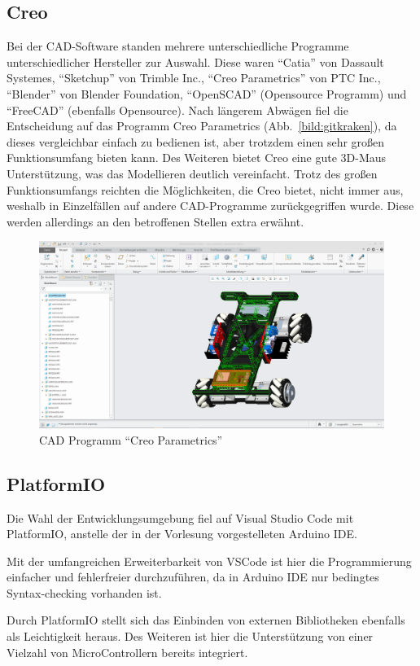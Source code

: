 \subsection{Creo}
Bei der CAD-Software standen mehrere unterschiedliche Programme unterschiedlicher Hersteller zur Auswahl.
Diese waren ``Catia'' von Dassault Systemes, ``Sketchup'' von Trimble Inc., ``Creo Parametrics'' von PTC Inc., ``Blender'' von Blender Foundation, ``OpenSCAD'' (Opensource Programm) und ``FreeCAD'' (ebenfalls Opensource).
Nach längerem Abwägen fiel die Entscheidung auf das Programm Creo Parametrics (Abb.~\ref{bild:gitkraken}), da dieses vergleichbar einfach zu bedienen ist, aber trotzdem einen sehr großen Funktionsumfang bieten kann.
Des Weiteren bietet Creo eine gute 3D-Maus Unterstützung, was das Modellieren deutlich vereinfacht.
Trotz des großen Funktionsumfangs reichten die Möglichkeiten, die Creo bietet, nicht immer aus, weshalb in Einzelfällen auf andere CAD-Programme zurückgegriffen wurde. Diese werden allerdings an den betroffenen Stellen extra erwähnt. 

\begin{figure}[!ht]
	\centering
	\includegraphics[width=\textwidth]{bilder/CreoParametrics.png}
	\caption{CAD Programm ``Creo Parametrics''}
	\label{bild:creo}
\end{figure}

\newpage
\subsection{PlatformIO}
Die Wahl der Entwicklungsumgebung fiel auf Visual Studio Code mit PlatformIO, anstelle der in der Vorlesung vorgestelleten Arduino IDE.

Mit der umfangreichen Erweiterbarkeit von VSCode ist hier die Programmierung einfacher und fehlerfreier durchzuführen, da in Arduino IDE nur bedingtes Syntax-checking vorhanden ist.

Durch PlatformIO stellt sich das Einbinden von externen Bibliotheken ebenfalls als Leichtigkeit heraus.
Des Weiteren ist hier die Unterstützung von einer Vielzahl von MicroControllern bereits integriert.